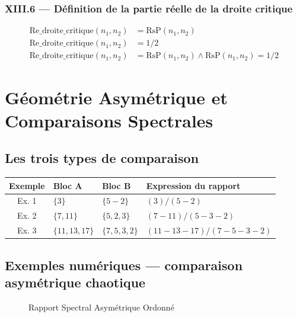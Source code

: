 \documentclass[11pt,a4paper]{article}
\begin{document}
\subsubsection*{XIII.6 --- Définition de la partie réelle de la droite critique}
\begin{align}
\text{Re\_droite\_critique}(n_1, n_2) &= \text{RsP}(n_1, n_2) \\
\text{Re\_droite\_critique}(n_1, n_2) &= 1/2 \\
\text{Re\_droite\_critique}(n_1, n_2) &= \text{RsP}(n_1, n_2) \wedge \text{RsP}(n_1, n_2) = 1/2
\end{align}

\section{Géométrie Asymétrique et Comparaisons Spectrales}

\subsection{Les trois types de comparaison}

\begin{longtable}{clll}
\toprule
\textbf{Exemple} & \textbf{Bloc A} & \textbf{Bloc B} & \textbf{Expression du rapport} \\
\midrule
Ex. 1 & $\{3\}$          & $\{5-2\}$      & $(3)/(5-2)$ \\
Ex. 2 & $\{7, 11\}$      & $\{5, 2, 3\}$  & $(7-11)/(5-3-2)$ \\
Ex. 3 & $\{11, 13, 17\}$ & $\{7, 5, 3, 2\}$ & $(11-13-17)/(7-5-3-2)$ \\
\bottomrule
\end{longtable}

\subsection{Exemples numériques --- comparaison asymétrique chaotique}

\begin{figure}[h]
\centering
{}
\caption{Rapport Spectral Asymétrique Ordonné}
\end{figure}
\end{document}
